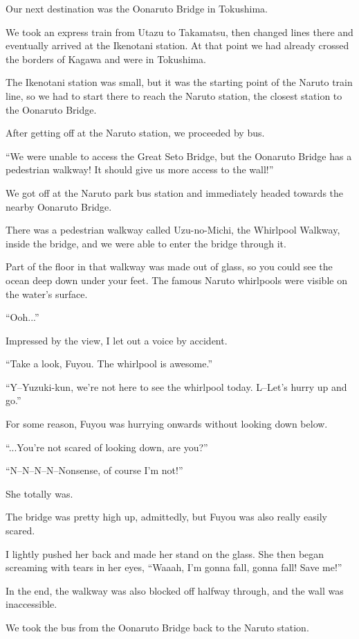 Our next destination was the Oonaruto Bridge in Tokushima.

We took an express train from Utazu to Takamatsu, then changed lines there and eventually arrived at the Ikenotani station. At that point we had already crossed the borders of Kagawa and were in Tokushima.

The Ikenotani station was small, but it was the starting point of the Naruto train line, so we had to start there to reach the Naruto station, the closest station to the Oonaruto Bridge.

After getting off at the Naruto station, we proceeded by bus.

``We were unable to access the Great Seto Bridge, but the Oonaruto Bridge has a pedestrian walkway! It should give us more access to the wall!''

We got off at the Naruto park bus station and immediately headed towards the nearby Oonaruto Bridge.

There was a pedestrian walkway called Uzu-no-Michi, the Whirlpool Walkway, inside the bridge, and we were able to enter the bridge through it.

Part of the floor in that walkway was made out of glass, so you could see the ocean deep down under your feet. The famous Naruto whirlpools were visible on the water's surface.

``Ooh...''

Impressed by the view, I let out a voice by accident.

``Take a look, Fuyou. The whirlpool is awesome.''

``Y--Yuzuki-kun, we're not here to see the whirlpool today. L--Let's hurry up and go.''

For some reason, Fuyou was hurrying onwards without looking down below.

``...You're not scared of looking down, are you?''

``N--N--N--N--Nonsense, of course I'm not!''

She totally was.

The bridge was pretty high up, admittedly, but Fuyou was also really easily scared.

I lightly pushed her back and made her stand on the glass. She then began screaming with tears in her eyes, ``Waaah, I'm gonna fall, gonna fall! Save me!''

In the end, the walkway was also blocked off halfway through, and the wall was inaccessible.

We took the bus from the Oonaruto Bridge back to the Naruto station.

